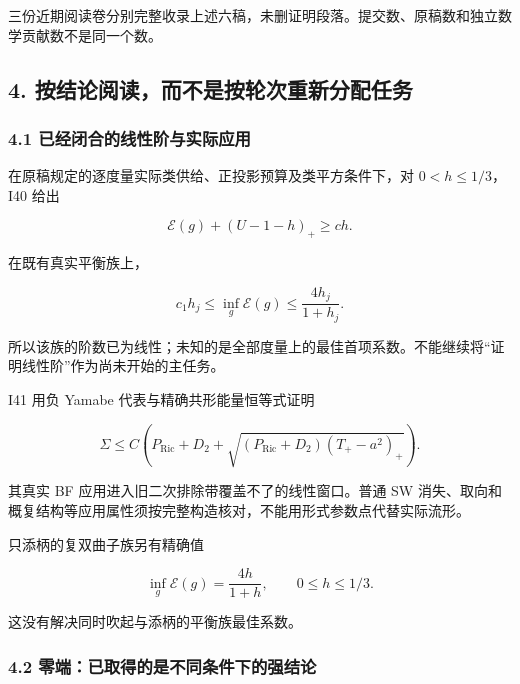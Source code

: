 \documentclass[
  10pt,
]{article}
\begin{document}
三份近期阅读卷分别完整收录上述六稿，未删证明段落。提交数、原稿数和独立数学贡献数不是同一个数。

\hypertarget{ux6309ux7ed3ux8bbaux9605ux8bfbux800cux4e0dux662fux6309ux8f6eux6b21ux91cdux65b0ux5206ux914dux4efbux52a1}{%
\subsection{4.
按结论阅读，而不是按轮次重新分配任务}\label{ux6309ux7ed3ux8bbaux9605ux8bfbux800cux4e0dux662fux6309ux8f6eux6b21ux91cdux65b0ux5206ux914dux4efbux52a1}}

\hypertarget{ux5df2ux7ecfux95edux5408ux7684ux7ebfux6027ux9636ux4e0eux5b9eux9645ux5e94ux7528}{%
\subsubsection{4.1
已经闭合的线性阶与实际应用}\label{ux5df2ux7ecfux95edux5408ux7684ux7ebfux6027ux9636ux4e0eux5b9eux9645ux5e94ux7528}}

在原稿规定的逐度量实际类供给、正投影预算及类平方条件下，对
\(0<h\le1/3\)，I40 给出

\[
\mathcal E(g)+(U-1-h)_+\ge ch.
\]

在既有真实平衡族上，

\[
c_1h_j\le\inf_g\mathcal E(g)\le\frac{4h_j}{1+h_j}.
\]

所以该族的阶数已为线性；未知的是全部度量上的最佳首项系数。不能继续将``证明线性阶''作为尚未开始的主任务。

I41 用负 Yamabe 代表与精确共形能量恒等式证明

\[
\Sigma\le C\left(P_{\mathrm{Ric}}+D_2+
 \sqrt{(P_{\mathrm{Ric}}+D_2)(T_+-a^2)_+}\right).
\]

其真实 BF 应用进入旧二次排除带覆盖不了的线性窗口。普通 SW
消失、取向和概复结构等应用属性须按完整构造核对，不能用形式参数点代替实际流形。

只添柄的复双曲子族另有精确值

\[
\inf_g\mathcal E(g)=\frac{4h}{1+h},\qquad 0\le h\le1/3.
\]

这没有解决同时吹起与添柄的平衡族最佳系数。

\hypertarget{ux96f6ux7aefux5df2ux53d6ux5f97ux7684ux662fux4e0dux540cux6761ux4ef6ux4e0bux7684ux5f3aux7ed3ux8bba}{%
\subsubsection{4.2
零端：已取得的是不同条件下的强结论}\label{ux96f6ux7aefux5df2ux53d6ux5f97ux7684ux662fux4e0dux540cux6761ux4ef6ux4e0bux7684ux5f3aux7ed3ux8bba}}
\end{document}
